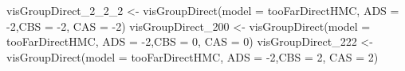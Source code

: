\documentclass[
  10pt,
  dvipsnames,enabledeprecatedfontcommands]{scrartcl}
\newenvironment{Shaded}{\begin{snugshade}}{\end{snugshade}}
\newcommand{\AttributeTok}[1]{\textcolor[rgb]{0.77,0.63,0.00}{#1}}
\newcommand{\DecValTok}[1]{\textcolor[rgb]{0.00,0.00,0.81}{#1}}
\newcommand{\FunctionTok}[1]{\textcolor[rgb]{0.00,0.00,0.00}{#1}}
\newcommand{\NormalTok}[1]{#1}
\newcommand{\OtherTok}[1]{\textcolor[rgb]{0.56,0.35,0.01}{#1}}
\newcommand{\SpecialCharTok}[1]{\textcolor[rgb]{0.00,0.00,0.00}{#1}}
\begin{document}
\begin{Shaded}
\begin{Highlighting}[]
\NormalTok{visGroupDirect\_2\_2\_2 }\OtherTok{\textless{}{-}}  \FunctionTok{visGroupDirect}\NormalTok{(}\AttributeTok{model =}\NormalTok{ tooFarDirectHMC, }\AttributeTok{ADS =} \SpecialCharTok{{-}}\DecValTok{2}\NormalTok{,}\AttributeTok{CBS =} \SpecialCharTok{{-}}\DecValTok{2}\NormalTok{, }\AttributeTok{CAS =} \SpecialCharTok{{-}}\DecValTok{2}\NormalTok{)}
\NormalTok{visGroupDirect\_200 }\OtherTok{\textless{}{-}}  \FunctionTok{visGroupDirect}\NormalTok{(}\AttributeTok{model =}\NormalTok{ tooFarDirectHMC, }\AttributeTok{ADS =} \SpecialCharTok{{-}}\DecValTok{2}\NormalTok{,}\AttributeTok{CBS =} \DecValTok{0}\NormalTok{, }\AttributeTok{CAS =} \DecValTok{0}\NormalTok{)}
\NormalTok{visGroupDirect\_222 }\OtherTok{\textless{}{-}} \FunctionTok{visGroupDirect}\NormalTok{(}\AttributeTok{model =}\NormalTok{ tooFarDirectHMC, }\AttributeTok{ADS =} \SpecialCharTok{{-}}\DecValTok{2}\NormalTok{,}\AttributeTok{CBS =} \DecValTok{2}\NormalTok{, }\AttributeTok{CAS =} \DecValTok{2}\NormalTok{)}



\end{Highlighting}
\end{Shaded}
\end{document}
